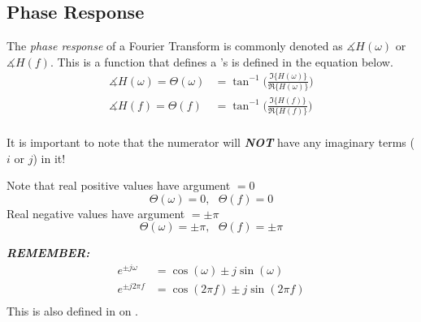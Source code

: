 \subsection{Phase Response}\label{subsec:Fourier_Phase_Response}
\begin{definition}\label{def:Fourier_Phase_Response}
  The \emph{phase response} of a Fourier Transform is commonly denoted as $\measuredangle H(\omega)$ or $\measuredangle H(f)$.
  This is a function that defines a 's  is defined in the equation below.
  \begin{equation}\label{eq:Fourier_Phase_Response}
    \begin{aligned}
      \measuredangle H(\omega) = \Theta (\omega) &= \tan^{-1} \Biggl( \frac{\Im \lbrace H(\omega) \rbrace}{\Re \lbrace H(\omega) \rbrace} \Biggr) \\
      \measuredangle H(f) = \Theta (f) &= \tan^{-1} \Biggl( \frac{\Im \lbrace H(f) \rbrace}{\Re \lbrace H(f) \rbrace} \Biggr) \\
    \end{aligned}
  \end{equation}

  \begin{remark}
    It is important to note that the numerator will \textbf{\emph{NOT}} have any imaginary terms ($i$ or $j$) in it!
  \end{remark}

  \begin{remark}
    Note that real positive values have argument $=0$
    \begin{equation}\label{eq:Fourier_Phase_Response-Real_Positive_Values}
      \Theta(\omega) = 0,\:\:\: \Theta(f) = 0
    \end{equation}
    Real negative values have argument $=\pm \pi$
    \begin{equation}\label{eq:Fourier_Phase_Response-Real_Negative_Values}
      \Theta(\omega) = \pm \pi,\:\:\: \Theta(f) = \pm \pi
    \end{equation}
  \end{remark}

  \begin{remark}\label{rmk:Complex_Exp-Unit_Circle_Relation}
    \textbf{\emph{REMEMBER:}}
    \begin{equation}\label{eq:Complex_Exp-Unit_Circle_Relation}
      \begin{aligned}
        e^{\pm j\omega} &= \cos (\omega) \pm j \sin (\omega) \\
        e^{\pm j 2 \pi f} &= \cos (2 \pi f) \pm j \sin (2 \pi f) \\
      \end{aligned}
    \end{equation}
    This is also defined in  on .
  \end{remark}
\end{definition}


